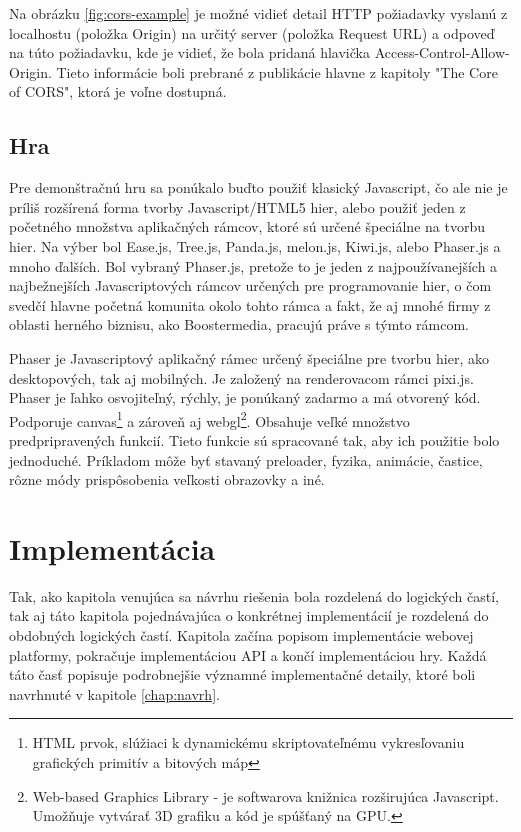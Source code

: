 Na obrázku \ref{fig:cors-example} je možné vidieť detail HTTP požiadavky vyslanú z localhostu (položka Origin) na určitý server (položka Request URL) a odpoveď na túto požiadavku, kde je vidieť, že bola pridaná hlavička Access-Control-Allow-Origin. Tieto informácie boli prebrané z publikácie \cite{cors} hlavne z kapitoly "The Core of CORS", ktorá je voľne dostupná.

\section{Hra}
\label{sec:hra}
Pre demonštračnú hru sa ponúkalo buďto použiť klasický Javascript, čo ale nie je príliš rozšírená forma tvorby Javascript/HTML5 hier, alebo použiť jeden z početného množstva aplikačných rámcov, ktoré sú určené špeciálne na tvorbu hier. Na výber bol Ease.js, Tree.js, Panda.js, melon.js, Kiwi.js, alebo Phaser.js a mnoho ďalších. Bol vybraný Phaser.js, pretože to je jeden z najpoužívanejších a najbežnejších Javascriptových rámcov určených pre programovanie hier, o čom svedčí hlavne početná komunita okolo tohto rámca a fakt, že aj mnohé firmy z oblasti herného biznisu, ako Boostermedia, pracujú práve s týmto rámcom. 

Phaser je Javascriptový aplikačný rámec určený špeciálne pre tvorbu hier, ako desktopových, tak aj mobilných. Je založený na renderovacom rámci pixi.js. Phaser je ľahko osvojiteľný, rýchly, je ponúkaný zadarmo a má otvorený kód. Podporuje canvas\footnote{HTML prvok, slúžiaci k dynamickému skriptovateľnému vykresľovaniu grafických primitív a bitových máp} a zároveň aj webgl\footnote{Web-based Graphics Library - je softwarova knižnica rozširujúca Javascript. Umožňuje vytvárať 3D grafiku a kód je spúšťaný na GPU.}. Obsahuje veľké množstvo predpripravených funkcií. Tieto funkcie sú spracované tak, aby ich použitie bolo jednoduché. Príkladom môže byť stavaný preloader, fyzika, animácie, častice, rôzne módy prispôsobenia veľkosti obrazovky a iné. \cite{phaser}


\chapter{Implementácia}
\label{chap:implementacia}
Tak, ako kapitola venujúca sa návrhu riešenia bola rozdelená do logických častí, tak aj táto kapitola pojednávajúca o konkrétnej implementácií je rozdelená do obdobných logických častí. Kapitola začína popisom implementácie webovej platformy, pokračuje implementáciou API a končí implementáciou hry.  Každá táto časť popisuje podrobnejšie významné implementačné detaily, ktoré boli navrhnuté v kapitole \ref{chap:navrh}. 

